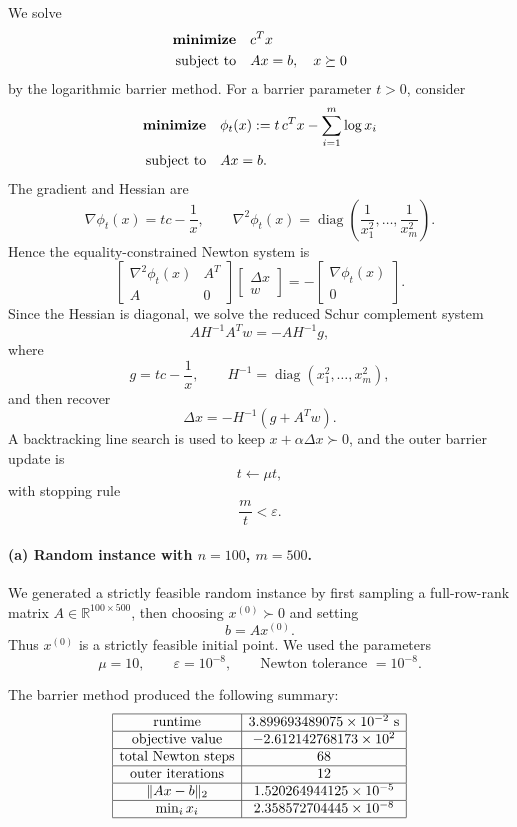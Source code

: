 \documentclass[11pt,letter,notitlepage]{article}
\DeclareMathOperator*{\minimize}{\bf minimize}
\theoremstyle{definition}
\begin{document}
\begin{solution}
We solve
\[
\begin{aligned}
\minimize \quad & c^T x\\
\text{subject to}\quad & Ax=b,\quad x \succeq 0
\end{aligned}
\]
by the logarithmic barrier method. For a barrier parameter $t>0$, consider
\[
\begin{aligned}
\minimize \quad & \phi_t(x):= t\,c^T x-\sum_{i=1}^m \log x_i\\
\text{subject to}\quad & Ax=b.
\end{aligned}
\]
The gradient and Hessian are
\[
\nabla \phi_t(x)= t c-\frac{1}{x},
\qquad
\nabla^2 \phi_t(x)=\operatorname{diag}\!\left(\frac{1}{x_1^2},\dots,\frac{1}{x_m^2}\right).
\]
Hence the equality-constrained Newton system is
\[
\begin{bmatrix}
\nabla^2 \phi_t(x) & A^T\\
A & 0
\end{bmatrix}
\begin{bmatrix}
\Delta x\\
w
\end{bmatrix}
=
-
\begin{bmatrix}
\nabla \phi_t(x)\\
0
\end{bmatrix}.
\]
Since the Hessian is diagonal, we solve the reduced Schur complement system
\[
A H^{-1} A^T w = - A H^{-1} g,
\]
where
\[
g = t c-\frac{1}{x},
\qquad
H^{-1}=\operatorname{diag}(x_1^2,\dots,x_m^2),
\]
and then recover
\[
\Delta x = -H^{-1}(g+A^T w).
\]
A backtracking line search is used to keep $x+\alpha \Delta x \succ 0$, and the outer barrier update is
\[
t \leftarrow \mu t,
\]
with stopping rule
\[
\frac{m}{t}<\varepsilon.
\]

\paragraph{(a) Random instance with $n=100$, $m=500$.}
We generated a strictly feasible random instance by first sampling a full-row-rank matrix
$A\in\mathbb{R}^{100\times 500}$, then choosing $x^{(0)} \succ 0$ and setting
\[
b=Ax^{(0)}.
\]
Thus $x^{(0)}$ is a strictly feasible initial point. We used the parameters
\[
\mu=10,\qquad \varepsilon=10^{-8},
\qquad \text{Newton tolerance }=10^{-8}.
\]

The barrier method produced the following summary:
\[
\begin{array}{|c|c|}
\hline
\text{runtime} & 3.899693489075\times 10^{-2}\ \text{s}\\
\hline
\text{objective value} & -2.612142768173\times 10^2\\
\hline
\text{total Newton steps} & 68\\
\hline
\text{outer iterations} & 12\\
\hline
\|Ax-b\|_2 & 1.520264944125\times 10^{-5}\\
\hline
\min_i x_i & 2.358572704445\times 10^{-8}\\
\hline
\end{array}
\]


\end{solution}
\end{document}

